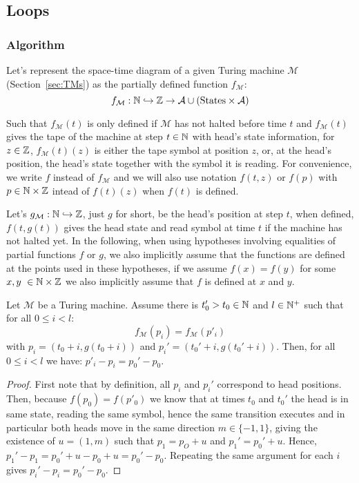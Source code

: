 \newpage
\subsection{Loops}\label{sec:loops}
\subsubsection{Algorithm}

Let's represent the space-time diagram of a given Turing machine $\mathcal{M}$ (Section~\ref{sec:TMs}) as the partially defined function $f_\mathcal{M}$: $$f_\mathcal{M}: \mathbb{N} \hookrightarrow \mathbb{Z} \to \mathcal{A} \cup (\text{States}\times\mathcal{A})$$

Such that $f_\mathcal{M}(t)$ is only defined if $\mathcal{M}$ has not halted before time $t$ and $f_\mathcal{M}(t)$ gives the tape of the machine at step $t\in\mathbb{N}$ with head's state information, \ie for $z\in\mathbb{Z}$, $f_\mathcal{M}(t)(z)$ is either the tape symbol at position $z$, or, at the head's position, the head's state together with the symbol it is reading. For convenience, we write $f$ instead of $f_\mathcal{M}$ and we will also use notation $f(t,z)$ or $f(p)$ with $p \in \mathbb{N} \times \mathbb{Z}$ intead of $f(t)(z)$ when $f(t)$ is defined.

Let's $g_\mathcal{M}: \mathbb{N} \hookrightarrow \mathbb{Z}$, just $g$ for short, be the head's position at step $t$, when defined, \ie $f(t,g(t))$ gives the head state and read symbol at time $t$ if the machine has not halted yet. In the following, when using hypotheses involving equalities of partial functions $f$ or $g$, we also implicitly assume that the functions are defined at the points used in these hypotheses, \eg if we assume $f(x) = f(y)$ for some $x,y \in \N \times \Z$ we also implicitly assume that $f$ is defined at $x$ and $y$.


\begin{lemma}\label{lem:vector} Let $\mathcal{M}$ be a Turing machine.
    Assume there is $t_0' > t_0 \in \mathbb{N}$ and $l \in \mathbb{N}^+$ such that
    for all $0 \leq i < l$: $$f_\mathcal{M}(p_i) = f_\mathcal{M}(p'_i)$$ with $p_i = (t_0+i, g(t_0+i))$ and $p_i' = (t_0'+i, g(t_0'+i))$. Then, for all $0 \leq i < l$ we have: $ p'_i - p_i = p_0' - p_0 $.
\end{lemma}

\begin{proof}
    First note that by definition, all $p_i$ and $p_i'$ correspond to head positions. Then, because $f(p_0) = f(p'_0)$ we know that at times $t_0$ and $t_0'$ the head is in same state, reading the same symbol, hence the same transition executes and in particular both heads move in the same direction $m \in \{-1,1\}$, giving the existence of $u = (1, m)$ such that $p_1 = p_O + u$ and $p_1' = p_0' + u$. Hence, $p_1' - p_1 = p_0' + u - p_0 + u = p_0' - p_0$. Repeating the same argument for each $i$ gives $p_i' - p_i = p_0' - p_0$.
\end{proof}

